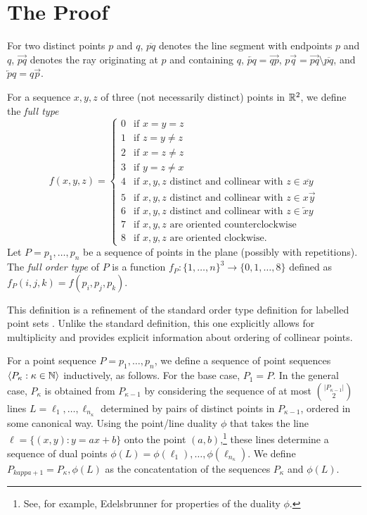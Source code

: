 \documentclass{patmorin}
\begin{document}
\section{The Proof}

For two distinct points $p$ and $q$, $\overline{pq}$
denotes the line segment with endpoints $p$ and $q$,
$\overrightarrow{pq}$ denotes the ray originating at $p$ and
containing $q$, $\overleftarrow{pq}= \overrightarrow{qp}$,
$p\!\overrightarrow{q} = \overrightarrow{pq}\setminus \overline{pq}$,
and $\overleftarrow{p}\!q= q\overrightarrow{p}$.

For a sequence $x,y,z$ of three (not necessarily distinct) points in $\mathbb{R}^2$,
we define the \emph{full type} 
\[
    f(x,y,z) = 
    \begin{cases}
      0 & \text{if $x=y=z$} \\
      1 & \text{if $z=y\neq z$} \\
      2 & \text{if $x=z\neq z$} \\
      3 & \text{if $y=z\neq x$} \\
      4 & \text{if $x,y,z$ distinct and collinear with $z\in\overline{xy}$} \\
      5 & \text{if $x,y,z$ distinct and collinear with $z\in x\!\overrightarrow{y}$} \\
      6 & \text{if $x,y,z$ distinct and collinear with $z\in\overleftarrow{x}\!y$} \\
      7 & \text{if $x,y,z$ are oriented counterclockwise} \\
      8 & \text{if $x,y,z$ are oriented clockwise.}
   \end{cases}
\]
Let $P=p_1,\ldots,p_n$ be a sequence of points in the plane
(possibly with repetitions).  The \emph{full order type} of $P$ is a
function $f_P\colon \{1,\ldots,n\}^3\to \{0,1,\ldots,8\}$ defined as
$f_P(i,j,k)=f(p_i,p_j,p_k)$.

This definition is a refinement of the standard order type definition for
labelled point sets \cite{goodman.pollack:allowable, matousek:lectures}.
Unlike the standard definition, this one explicitly allows for
multiplicity and provides explicit information about ordering of
collinear points.

For a point sequence $P=p_1,\ldots,p_n$, we define a sequence of
point sequences $\langle P_\kappa:\kappa\in \mathbb{N}\rangle$ inductively,
as follows.  For the base case, $P_1=P$. In the general case, $P_{\kappa}$
is obtained from $P_{\kappa-1}$ by considering the sequence of at most
$\binom{|P_{\kappa-1}|}{2}$ lines $L=\ell_1,\ldots,\ell_{n_\kappa}$
determined by pairs of distinct points in $P_{\kappa-1}$, ordered in
some canonical way.  Using the point/line duality $\phi$ that takes
the line $\ell=\{(x,y): y=ax+b\}$ onto the point $(a,b)$,\footnote{See,
for example, Edelsbrunner \cite[Section~1.4]{edelsbrunner:algorithms}
for properties of the duality $\phi$.} these lines determine a sequence
of dual points $\phi(L)=\phi(\ell_1),\ldots,\phi(\ell_{n_\kappa})$.
We define $P_{kappa+1}=P_\kappa,\phi(L)$ as the concatentation of the
sequences $P_\kappa$ and $\phi(L)$.
\end{document}
